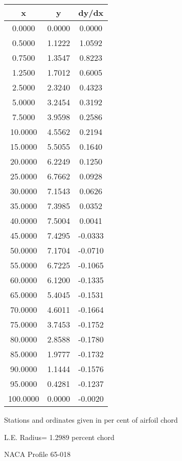 \documentclass[11pt]{book}
\begin{document}
 \vspace{8mm}
 \begin{tabular}{|c|c|c|} \hline 
  x  &  y  &  dy/dx \\
 \hline
0.0000 & 0.0000 & 0.0000 \\
0.5000 & 1.1222 & 1.0592 \\
0.7500 & 1.3547 & 0.8223 \\
1.2500 & 1.7012 & 0.6005 \\
2.5000 & 2.3240 & 0.4323 \\
5.0000 & 3.2454 & 0.3192 \\
7.5000 & 3.9598 & 0.2586 \\
10.0000 & 4.5562 & 0.2194 \\
15.0000 & 5.5055 & 0.1640 \\
20.0000 & 6.2249 & 0.1250 \\
25.0000 & 6.7662 & 0.0928 \\
30.0000 & 7.1543 & 0.0626 \\
35.0000 & 7.3985 & 0.0352 \\
40.0000 & 7.5004 & 0.0041 \\
45.0000 & 7.4295 & -0.0333 \\
50.0000 & 7.1704 & -0.0710 \\
55.0000 & 6.7225 & -0.1065 \\
60.0000 & 6.1200 & -0.1335 \\
65.0000 & 5.4045 & -0.1531 \\
70.0000 & 4.6011 & -0.1664 \\
75.0000 & 3.7453 & -0.1752 \\
80.0000 & 2.8588 & -0.1780 \\
85.0000 & 1.9777 & -0.1732 \\
90.0000 & 1.1444 & -0.1576 \\
95.0000 & 0.4281 & -0.1237 \\
100.0000 & 0.0000 & -0.0020 \\
 \hline
 \end{tabular}
 \vspace{8mm}


Stations and ordinates given in per cent of airfoil chord 


L.E. Radius=  1.2989 percent chord
 \newpage
  \label{p65-018}
 \begin{Large}
 NACA Profile 65-018
 \end{Large}
  
\end{document}
